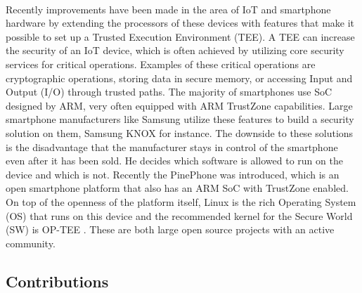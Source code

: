 \paragraph*{} 
Recently improvements have been made in the area of IoT and smartphone hardware by extending the processors of these devices with features that make it possible to set up a Trusted Execution Environment (TEE). A TEE can increase the security of an IoT device, which is often achieved by utilizing core security services for critical operations. Examples of these critical operations are cryptographic operations, storing data in secure memory, or accessing Input and Output (I/O) through trusted paths. The majority of smartphones use SoC designed by ARM, very often equipped with ARM TrustZone capabilities. Large smartphone manufacturers like Samsung utilize these features to build a security solution on them, Samsung KNOX \cite{KNOX} for instance. The downside to these solutions is the disadvantage that the manufacturer stays in control of the smartphone even after it has been sold. He decides which software is allowed to run on the device and which is not. Recently the PinePhone \cite{PinePhone} was introduced, which is an open smartphone platform that also has an ARM SoC with TrustZone enabled. On top of the openness of the platform itself, Linux is the rich Operating System (OS) that runs on this device and the recommended kernel for the Secure World (SW) is OP-TEE \cite{OP-TEE}. These are both large open source projects with an active community. 

\subsection*{Contributions}

